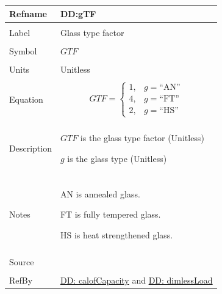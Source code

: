\documentclass[12pt]{article}
\begin{document}
\vspace{\baselineskip}
\noindent
\begin{minipage}{\textwidth}
\begin{tabular}{>{\raggedright}p{}>{\raggedright\arraybackslash}p{}}
\toprule \textbf{Refname} & \textbf{DD:gTF}
\label{DD:gTF}
\\ \midrule \\
Label & Glass type factor
        
\\ \midrule \\
Symbol & $GTF$
         
\\ \midrule \\
Units & Unitless
        
\\ \midrule \\
Equation & \begin{displaymath}
           GTF=\begin{cases}
               1, & g=\text{``AN''}\\
               4, & g=\text{``FT''}\\
               2, & g=\text{``HS''}
               \end{cases}
           \end{displaymath}
\\ \midrule \\
Description & \begin{symbDescription}
              \item{$GTF$ is the glass type factor (Unitless)}
              \item{$g$ is the glass type (Unitless)}
              \end{symbDescription}
\\ \midrule \\
Notes & AN is annealed glass.
        
        FT is fully tempered glass.
        
        HS is heat strengthened glass.
        
\\ \midrule \\
Source & \cite{astm2009}
         
\\ \midrule \\
RefBy & \hyperref[DD:calofCapacity]{DD: calofCapacity} and \hyperref[DD:dimlessLoad]{DD: dimlessLoad}
        
\\ \bottomrule
\end{tabular}
\end{minipage}
\end{document}
